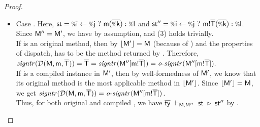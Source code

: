 {\begin{proof}
{\begin{itemize}
    \item Case . Here, $\st = \cond\i\j{\call\m{\ol{\v\k}}}{\v\l}$
      and $\st'' = \cond\i\j{\call{\msig{\m}{\ol\Ty}}{\ol{\v k}}}{\v\l}$.
      Since $\mathsf{M}'' = \mathsf{M}'$, we have  by assumption,
      and (3) holds trivially.\\
      If \msig\m{\ol\Ty} is an original method, then by
      $\lfloor \mathsf{M}' \rfloor = \mathsf{M}$ (because of \eqmtbld) and the properties
      of dispatch, \msig\m{\ol\Ty} has to be the method returned by
      \dispatch{\mtbl}{\m}{\ol\Ty}. Therefore,
      $\operatorname{\mathit{signtr}}(\operatorname{{\mathcal D}}(\mathsf{M},\mathsf{\mathsf{m}},{\overline{\mathsf{T}}})) = \overline{\mathsf{T}} =
        \operatorname{\mathit{signtr}}(\mathsf{M}''[{\mathsf{\mathsf{m}!{\overline{\mathsf{T}}}}}]) =
        \operatorname{\mathit{o-signtr}}(\mathsf{M}''[{\mathsf{\mathsf{m}!{\overline{\mathsf{T}}}}}]).$\\
      If \msig\m{\ol\Ty} is a compiled instance in $\mathsf{M}'$, then by
      well-formedness of $\mathsf{M}'$, we know that its original method is the
      most applicable method in $\lfloor \mathsf{M}' \rfloor$.
      Since $\lfloor \mathsf{M}' \rfloor = \mathsf{M}$, we get
      $\operatorname{\mathit{signtr}}(\operatorname{{\mathcal D}}(\mathsf{M},\mathsf{\mathsf{m}},{\overline{\mathsf{T}}})) =
        \operatorname{\mathit{o-signtr}}(\mathsf{M}''[{\mathsf{\mathsf{m}!{\overline{\mathsf{T}}}}}])$.\\
      Thus, for both original and compiled \msig\m{\ol\Ty}, we have
      $\overline{\mathsf{ty}}\ \vdash_{\mathsf{M},\mathsf{M}''}\ \mathsf{st}\ \triangleright\ \mathsf{st}''$ by .


\end{itemize}}
\end{proof}}
